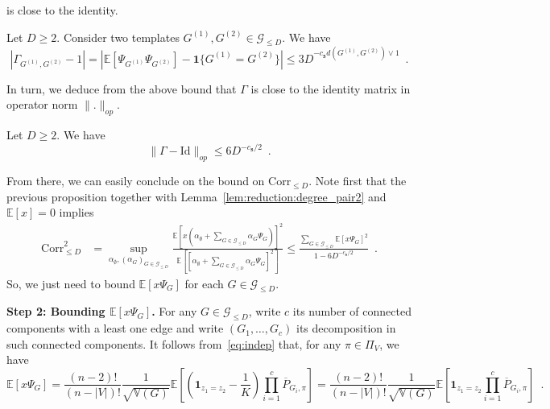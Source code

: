 \documentclass[final]{colt2026}
\newcommand{\1}{\mathbf{1}}
\begin{document}
is close to the identity.
\begin{proposition}\label{prop:scalprod}
Let $D\geq 2$.
    Consider two templates $G^{(1)},G^{(2)} \in \mathcal G_{\leq D}$. We have%
    \begin{equation*}
     |\Gamma_{G^{(1)}, G^{(2)}} -1|=    \left|\mathbb E\left[\Psi_{G^{(1)}}\Psi_{G^{(2)}}\right] - \mathbf 1\{G^{(1)} = G^{(2)}\}\right|\leq 3D^{-c_{\texttt{s}} d (G^{(1)}, G^{(2)})\lor 1}\enspace .
    \end{equation*}
\end{proposition} 
In turn, we deduce from the above bound that  $\Gamma$ is close to the identity matrix in operator norm $\|.\|_{op}$.
\begin{proposition}\label{prop:ortho}
Let $D\geq 2$.
We have
    \[
\|\Gamma - \mathrm{Id}\|_{op}\leq 6 D^{-c_{\texttt{s}}/2}\enspace . 
\]
\end{proposition}

 From there, we can easily conclude on the bound on $\mathrm{Corr}_{\leq D}$. Note first that the previous proposition together with Lemma~\ref{lem:reduction:degree_pair2} and  $\mathbb{E}[x]=0$ implies 
\begin{align}\label{eq:advat}
    \mathrm{Corr}^2_{\leq D} &= \sup_{\alpha_{\emptyset}, (\alpha_G)_{G\in \mathcal G_{\leq D}}} \frac{\mathbb E\left[ x\left(\alpha_{\emptyset} +\sum_{G \in \mathcal G_{\leq D}} \alpha_G \Psi_{G}\right)\right]^2}{\mathbb E\left[\left[\alpha_{\emptyset}+ \sum_{G\in \mathcal G_{\leq D}} \alpha_G \Psi_{G}\right]^2\right]} \leq \frac{\sum_{G\in \mathcal{G}_{\leq D}}\mathbb E[x\Psi_G]^2}{1- 6 D^{-c_{\texttt{s}}/2}}\enspace .
\end{align} 
So, we just need to bound $\mathbb E[x\Psi_G]$ for each $G\in \mathcal{G}_{\leq D}$.

\medskip

\noindent
{\bf Step 2: Bounding $\mathbb E [x\Psi_G]$.} For any $G\in \mathcal G_{\leq D}$, write $c$ its number of connected components with a least one edge and write $(G_1,\ldots, G_{c})$ its decomposition in such connected components. It follows from~\eqref{eq:indep} that, for any $\pi \in \Pi_V$, we have 
\begin{equation}
\mathbb E[x\Psi_G] = \frac{(n-2)!}{(n-|V|)!}\frac{1}{\sqrt{\mathbb V(G)}}\mathbb E\left[\left(\1_{z_1=z_2}-\frac{1}{K}\right) \prod_{i=1}^{c}  \overline{P}_{G_i,\pi}\right]=  \frac{(n-2)!}{(n-|V|)!}\frac{1}{\sqrt{\mathbb V(G)}}\mathbb E\left[\1_{z_1=z_2} \prod_{i=1}^{c}  \overline{P}_{G_i,\pi}\right]\enspace . 
\end{equation}
\end{document}
